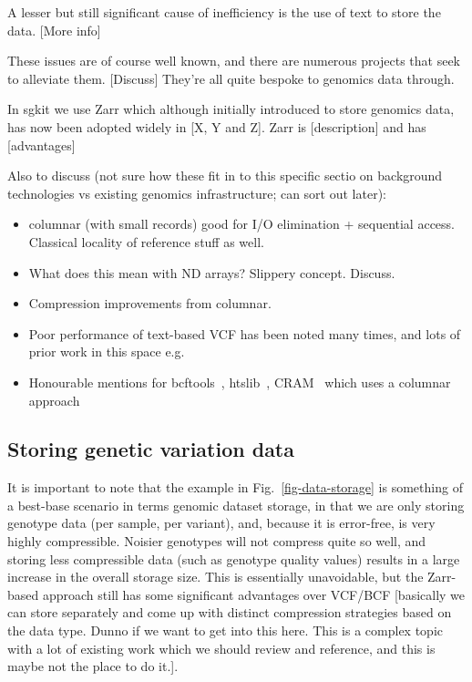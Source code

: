 \documentclass[a4paper,num-refs]{oup-contemporary}
\begin{document}
A lesser but still significant cause of inefficiency is the use of
text to store the data. [More info]

These issues are of course well known, and there are numerous projects
that seek to alleviate them. [Discuss] They're all quite bespoke to genomics data
through.

In sgkit we use Zarr which although initially introduced to store
genomics data, has now been adopted widely in [X, Y and Z].
Zarr is [description] and has [advantages]

Also to discuss (not sure how these fit in to this specific sectio
on background technologies vs existing genomics infrastructure; can
sort out later):

\begin{itemize}
\item columnar (with small records) good for I/O elimination + sequential access.
Classical locality of reference stuff as well.
\item What does this mean with ND arrays? Slippery concept. Discuss.
\item Compression improvements from columnar.
\item Poor performance of text-based VCF has been noted many times,
and lots of prior work in this space e.g. \citep{kelleher2013processing}
\item Honourable mentions for bcftools~\citep{danecek2021twelve},
htslib~\citep{bonfield2021htslib}, CRAM~\citep{bonfield2014scramble,bonfield2022cram}
which uses a columnar approach
\end{itemize}


\subsection{Storing genetic variation data}

It is important to note that the example in Fig.~\ref{fig-data-storage}
is something of a best-base
scenario in terms genomic dataset storage, in that we are only
storing genotype data (per sample, per variant),
and, because it is error-free, is very
highly compressible. Noisier genotypes will not compress quite
so well, and storing less compressible data (such as genotype
quality values) results in a large increase in the overall
storage size. This is essentially unavoidable, but the Zarr-based
approach still has some significant advantages over VCF/BCF
[basically we can store separately and come up with distinct
compression strategies based on the data type. Dunno if we
want to get into this here. This is a complex topic with
a lot of existing work which we should review and reference,
and this is maybe not the place to do it.].
\end{document}
